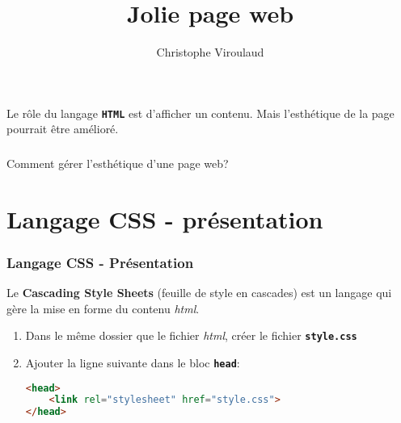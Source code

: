 \documentclass[svgnames,11pt]{beamer}
\author[]{Christophe Viroulaud}
\title{Jolie page web}
\date{\framebox{\textbf{Web 02}}}
\institute{Seconde - SNT}
\begin{document}
\begin{frame}
\titlepage
\end{frame}
\begin{frame}
    \frametitle{}

    Le rôle du langage \textbf{\texttt{HTML}} est d'afficher un contenu. Mais l'esthétique de la page pourrait être amélioré.

\end{frame}
\begin{frame}
    \frametitle{}

    \begin{framed}
        \centering Comment gérer l'esthétique d'une page web?
    \end{framed}

\end{frame}
\section{Langage CSS - présentation}
\begin{frame}[fragile]
    \frametitle{Langage CSS - Présentation}

    \begin{aretenir}[]
        Le \textbf{Cascading Style Sheets} (feuille de style en cascades) est un langage qui gère la mise en forme du contenu \emph{html}.
    \end{aretenir}
\begin{activite}
\begin{enumerate}
    \item Dans le même dossier que le fichier \emph{html}, créer le fichier \textbf{\texttt{style.css}}
    \item Ajouter la ligne suivante dans le bloc \textbf{\texttt{head}}:
\begin{lstlisting}[language=html , basicstyle=\ttfamily\small, xleftmargin=0.2em, xrightmargin=-1em]
<head>
    <link rel="stylesheet" href="style.css">
</head>
\end{lstlisting}
\end{enumerate}
\end{activite}
\end{frame}
\end{document}
